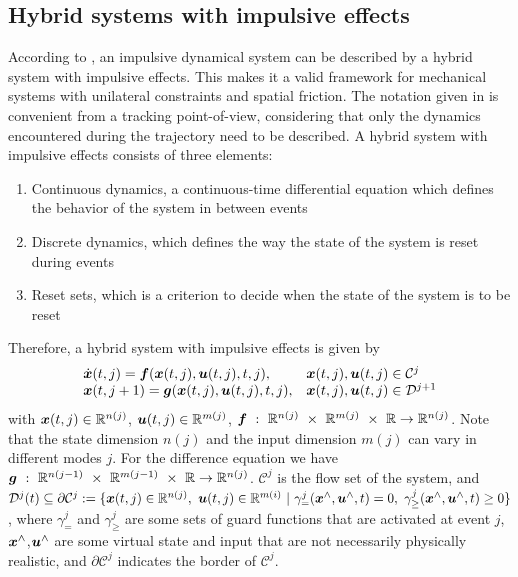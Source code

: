 \documentclass[../DC2017114Bouma.tex]{subfiles}
\begin{document}
%
\subsection{Hybrid systems with impulsive effects}\label{sec:2hyb}
According to \cite{Haddad2006}, an impulsive dynamical system can be described by a hybrid system with impulsive effects. This makes it a valid framework for mechanical systems with unilateral constraints and spatial friction. The notation given in \cite{Haddad2006} is convenient from a tracking point-of-view, considering that only the dynamics encountered during the trajectory need to be described. A hybrid system with impulsive effects consists of three elements:
\begin{enumerate}
\item Continuous dynamics, a continuous-time differential equation which defines the behavior of the system in between events
\item Discrete dynamics, which defines the way the state of the system is reset during events
\item Reset sets, which is a criterion to decide when the state of the system is to be reset
\end{enumerate}

Therefore, a hybrid system with impulsive effects is given by
\begin{equation}
\begin{array}{ll}
\dot{{\boldsymbol{x}}}(t,j) ={\boldsymbol{f}}({\boldsymbol{x}}(t,j),{\boldsymbol{u}}(t,j),t,j),& {\boldsymbol{x}}(t,j),{\boldsymbol{u}}(t,j)\in \mathcal{C}^j\\
{\boldsymbol{x}}(t,j+1) = {\boldsymbol{g}}({\boldsymbol{x}}(t,j),{\boldsymbol{u}}(t,j),t,j),& {\boldsymbol{x}}(t,j),{\boldsymbol{u}}(t,j)\in \mathcal{D}^{j+1}
\end{array}\label{eq:hybimp}
\end{equation}
%
%
%
%
%
%
%
with ${\boldsymbol{x}}(t,j)\in\mathbb{R}^{n(j)}$, ${\boldsymbol{u}}(t,j)\in\mathbb{R}^{m(j)}$, $\fb\ :\ \Rbb^{n(j)}\ \times\ \Rbb^{m(j)}\ \times\ \Rbb\rightarrow \Rbb^{n(j)}$. Note that the state dimension $n(j)$ and the input dimension $m(j)$ can vary in different modes $j$. For the difference equation we have $\gb\ :\ \Rbb^{n(j-1)}\ \times\ \Rbb^{m(j-1)}\ \times\ \Rbb\rightarrow \Rbb^{n(j)}$. $\mathcal{C}^j$ is the flow set of the system, and $\mathcal{D}^j(t) \subseteq \partial \mathcal{C}^j := \{\xb(t,j)\in\Rbb^{n(j)},\ \ub(t,j)\in\Rbb^{m(i)}\ |\ \gamma_{=}^j(\xb^{\wedge},\ub^{\wedge},t) = 0, \ \gamma_{\geq}^j(\xb^{\wedge},\ub^{\wedge},t) \geq 0\}$, where $\gamma_{=}^j$ and $\gamma_{\geq}^j$ are some sets of guard functions that are activated at event $j$, ${\boldsymbol{x}}^{\wedge}$,${\boldsymbol{u}}^{\wedge}$ are some virtual state and input that are not necessarily physically realistic, and $\partial \mathcal{C}^j$ indicates the border of $\mathcal{C}^j$.
\end{document}
